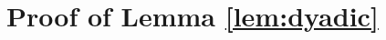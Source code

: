 \documentclass[conference]{IEEEtran}
\theoremstyle{definition}
\newcommand{\wt}{\operatorname{wt}}
\newcommand{\F}{\mathcal{F}}
\newcommand{\ind}{\operatorname{ind}}
\newcommand{\ev}{\operatorname{ev}}
\begin{document}





\section{Proof of Lemma \ref{lem:dyadic}}
\end{document}
